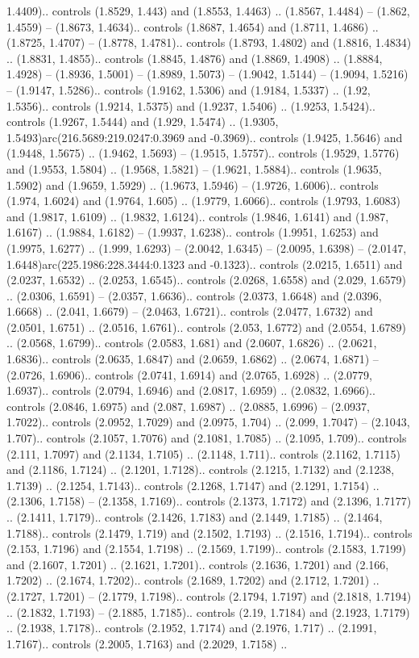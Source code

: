 1.4409).. controls (1.8529, 1.443) and (1.8553, 1.4463) .. (1.8567, 1.4484) -- (1.862, 1.4559) -- (1.8673, 1.4634).. controls (1.8687, 1.4654) and (1.8711, 1.4686) .. (1.8725, 1.4707) -- (1.8778, 1.4781).. controls (1.8793, 1.4802) and (1.8816, 1.4834) .. (1.8831, 1.4855).. controls (1.8845, 1.4876) and (1.8869, 1.4908) .. (1.8884, 1.4928) -- (1.8936, 1.5001) -- (1.8989, 1.5073) -- (1.9042, 1.5144) -- (1.9094, 1.5216) -- (1.9147, 1.5286).. controls (1.9162, 1.5306) and (1.9184, 1.5337) .. (1.92, 1.5356).. controls (1.9214, 1.5375) and (1.9237, 1.5406) .. (1.9253, 1.5424).. controls (1.9267, 1.5444) and (1.929, 1.5474) .. (1.9305, 1.5493)arc(216.5689:219.0247:0.3969 and -0.3969).. controls (1.9425, 1.5646) and (1.9448, 1.5675) .. (1.9462, 1.5693) -- (1.9515, 1.5757).. controls (1.9529, 1.5776) and (1.9553, 1.5804) .. (1.9568, 1.5821) -- (1.9621, 1.5884).. controls (1.9635, 1.5902) and (1.9659, 1.5929) .. (1.9673, 1.5946) -- (1.9726, 1.6006).. controls (1.974, 1.6024) and (1.9764, 1.605) .. (1.9779, 1.6066).. controls (1.9793, 1.6083) and (1.9817, 1.6109) .. (1.9832, 1.6124).. controls (1.9846, 1.6141) and (1.987, 1.6167) .. (1.9884, 1.6182) -- (1.9937, 1.6238).. controls (1.9951, 1.6253) and (1.9975, 1.6277) .. (1.999, 1.6293) -- (2.0042, 1.6345) -- (2.0095, 1.6398) -- (2.0147, 1.6448)arc(225.1986:228.3444:0.1323 and -0.1323).. controls (2.0215, 1.6511) and (2.0237, 1.6532) .. (2.0253, 1.6545).. controls (2.0268, 1.6558) and (2.029, 1.6579) .. (2.0306, 1.6591) -- (2.0357, 1.6636).. controls (2.0373, 1.6648) and (2.0396, 1.6668) .. (2.041, 1.6679) -- (2.0463, 1.6721).. controls (2.0477, 1.6732) and (2.0501, 1.6751) .. (2.0516, 1.6761).. controls (2.053, 1.6772) and (2.0554, 1.6789) .. (2.0568, 1.6799).. controls (2.0583, 1.681) and (2.0607, 1.6826) .. (2.0621, 1.6836).. controls (2.0635, 1.6847) and (2.0659, 1.6862) .. (2.0674, 1.6871) -- (2.0726, 1.6906).. controls (2.0741, 1.6914) and (2.0765, 1.6928) .. (2.0779, 1.6937).. controls (2.0794, 1.6946) and (2.0817, 1.6959) .. (2.0832, 1.6966).. controls (2.0846, 1.6975) and (2.087, 1.6987) .. (2.0885, 1.6996) -- (2.0937, 1.7022).. controls (2.0952, 1.7029) and (2.0975, 1.704) .. (2.099, 1.7047) -- (2.1043, 1.707).. controls (2.1057, 1.7076) and (2.1081, 1.7085) .. (2.1095, 1.709).. controls (2.111, 1.7097) and (2.1134, 1.7105) .. (2.1148, 1.711).. controls (2.1162, 1.7115) and (2.1186, 1.7124) .. (2.1201, 1.7128).. controls (2.1215, 1.7132) and (2.1238, 1.7139) .. (2.1254, 1.7143).. controls (2.1268, 1.7147) and (2.1291, 1.7154) .. (2.1306, 1.7158) -- (2.1358, 1.7169).. controls (2.1373, 1.7172) and (2.1396, 1.7177) .. (2.1411, 1.7179).. controls (2.1426, 1.7183) and (2.1449, 1.7185) .. (2.1464, 1.7188).. controls (2.1479, 1.719) and (2.1502, 1.7193) .. (2.1516, 1.7194).. controls (2.153, 1.7196) and (2.1554, 1.7198) .. (2.1569, 1.7199).. controls (2.1583, 1.7199) and (2.1607, 1.7201) .. (2.1621, 1.7201).. controls (2.1636, 1.7201) and (2.166, 1.7202) .. (2.1674, 1.7202).. controls (2.1689, 1.7202) and (2.1712, 1.7201) .. (2.1727, 1.7201) -- (2.1779, 1.7198).. controls (2.1794, 1.7197) and (2.1818, 1.7194) .. (2.1832, 1.7193) -- (2.1885, 1.7185).. controls (2.19, 1.7184) and (2.1923, 1.7179) .. (2.1938, 1.7178).. controls (2.1952, 1.7174) and (2.1976, 1.717) .. (2.1991, 1.7167).. controls (2.2005, 1.7163) and (2.2029, 1.7158) .. 